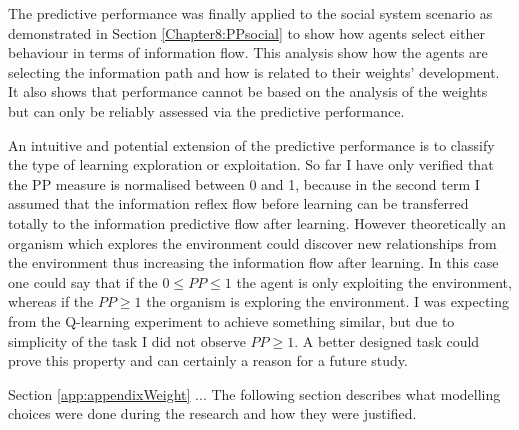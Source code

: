 The predictive performance was finally applied to the social system scenario
as demonstrated in Section \ref{Chapter8:PPsocial} to show how agents
select either behaviour in terms of information flow.
This analysis show how the agents are selecting the information path and 
how is related to their weights' development.
It also shows that performance cannot be based on the analysis of the weights
but can only be reliably assessed via the predictive performance.

An intuitive and potential extension of the predictive performance is to classify the 
type of learning exploration or exploitation.
So far I have only verified that the PP measure is normalised between 0 and 1,
because in the second term I assumed that the information reflex flow before learning
can be transferred totally to the information predictive flow after learning.
However theoretically an organism which explores the environment could discover 
new relationships from the environment thus increasing the information flow after learning.
In this case one could say that if the $0 \leq PP \leq 1$ the agent is only exploiting the environment, whereas if the $PP \geq 1$ the organism is exploring the environment.
I was expecting from the Q-learning experiment to achieve something similar, but due to simplicity of the task I did not observe $PP \geq 1$.
A better designed task could prove this property and can certainly a reason for a future study.

Section \ref{app:appendixWeight} ...
The following section describes what modelling choices were done during the
research and how they were justified.

